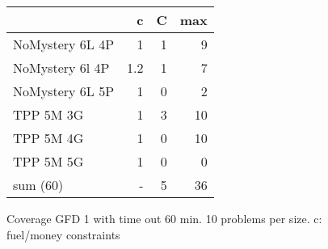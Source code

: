\setlength{\tabcolsep}{3pt}
\begin{figure}[ht]
	\centering
	\begin{tabular}{l|r|rr}
			& c & C & max \\\hline
		NoMystery 6L 4P & 1 & 1 & 9 \\
		NoMystery 6l 4P & 1.2 & 1 & 7\\
		NoMystery 6L 5P & 1 & 0 & 2\\
		TPP 5M 3G & 1 & 3 & 10\\
		TPP 5M 4G & 1 & 0 & 10\\
		TPP 5M 5G & 1 & 0 &	0 \\\hline
		sum \numtasks(60) & - & 5 & 36 \\
	\end{tabular}
	\caption{Coverage GFD 1 with time out 60 min. 10 problems per size. c: fuel/money constraints }
\end{figure}


